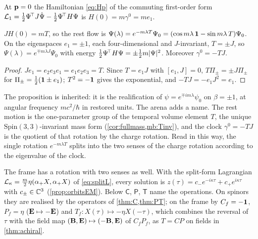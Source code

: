 At $\mathbf p=0$ the Hamiltonian \eqref{eq:Hp} of the commuting first-order form $\mathcal L_1=\tfrac12\Psi^{\!\top}J\dot\Psi-\tfrac12\Psi^{\!\top}H\Psi$ is
$H(0)=m\gamma^0=me_1$.

\begin{proposition}
\label{mb:restflow}
$JH(0)=mT$, so the rest flow is $\Psi(\lambda)=e^{-m\lambda T}\Psi_0=(\cos m\lambda\,\mathbf 1-\sin m\lambda\,T)\Psi_0$. On the eigenspaces $e_1=\pm1$, each
four-dimensional and $J$-invariant, $T=\pm J$, so $\Psi(\lambda)=e^{\mp m\lambda J}\Psi_0$ with energy $\tfrac12\Psi^{\!\top}H\Psi=\pm\tfrac12 m|\Psi|^2$.
Moreover $\gamma^0=-TJ$.
\end{proposition}

\begin{proof}
$Je_1=e_2e_3e_1=e_1e_2e_3=T$. Since $T=e_1J$ with $[e_1,J]=0$, $T\Pi_\pm=\pm J\Pi_\pm$ for $\Pi_\pm=\tfrac12(\mathbf 1\pm e_1)$; $T^2=-\mathbf 1$ gives the
exponential, and $-TJ=-e_1J^2=e_1$.
\end{proof}

The proposition is inherited: it is the realification of $\psi=e^{\mp im\lambda}\psi_0$ on $\beta=\pm1$, at angular frequency $mc^2/\hbar$ in
restored units. The arena adds a name. The rest motion is the one-parameter group of the temporal volume element $T$, the unique
$\mathrm{Spin}(3,3)$-invariant mass form (\cref{cor:fullmass,mb:Tinv}), and the clock $\gamma^0=-TJ$ is the quotient of that rotation by the charge
rotation. Read in this way, the single rotation $e^{-m\lambda T}$ splits into the two senses of the charge rotation according to the
eigenvalue of the clock.

The frame has a rotation with two senses as well. With the split-form Lagrangian $\mathcal L_\kappa=\tfrac m2\eta(\alpha_+X,\alpha_+X)$ of
\eqref{eq:splitL}, every solution is $z(\tau)=c_-e^{-i\kappa\tau}+c_+e^{i\kappa\tau}$ with $c_\pm\in\mathbb{C}^3$ (\cref{prop:orbitsEM}). Below
$\mathsf C$, $\mathsf P$, $\mathsf T$ name the operations. On spinors they are realised by the operators of \cref{thm:C,thm:PT}; on the frame
by $C_f=-\mathbf 1$, $P_f=\eta$ ($\mathbf E\mapsto-\mathbf E$) and $T_f\colon X(\tau)\mapsto-\eta X(-\tau)$, which combines the reversal of $\tau$ with the field
map $(\mathbf B,\mathbf E)\mapsto(-\mathbf B,\mathbf E)$ of $C_fP_f$, as $T=CP$ on fields in \cref{thm:achiral}.

